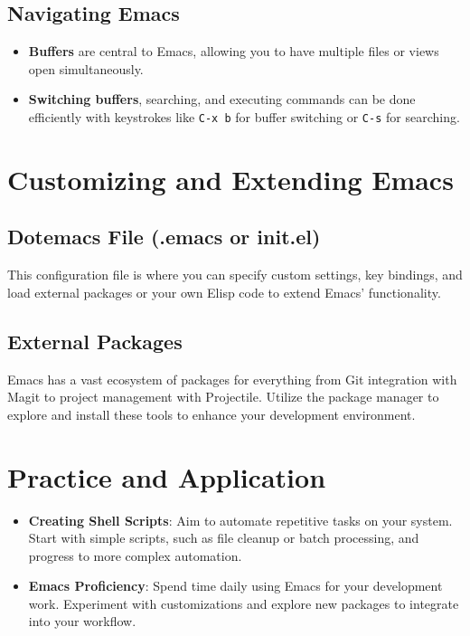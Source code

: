 \documentclass{article}
\begin{document}
\subsection{Navigating Emacs}

\begin{itemize}
    \item \textbf{Buffers} are central to Emacs, allowing you to have multiple files or views open simultaneously.
    \item \textbf{Switching buffers}, searching, and executing commands can be done efficiently with keystrokes like \texttt{C-x b} for buffer switching or \texttt{C-s} for searching.
\end{itemize}

\section{Customizing and Extending Emacs}

\subsection{Dotemacs File (.emacs or init.el)}

This configuration file is where you can specify custom settings, key bindings, and load external packages or your own Elisp code to extend Emacs' functionality.

\subsection{External Packages}

Emacs has a vast ecosystem of packages for everything from Git integration with Magit to project management with Projectile. Utilize the package manager to explore and install these tools to enhance your development environment.

\section{Practice and Application}

\begin{itemize}
    \item \textbf{Creating Shell Scripts}: Aim to automate repetitive tasks on your system. Start with simple scripts, such as file cleanup or batch processing, and progress to more complex automation.
    \item \textbf{Emacs Proficiency}: Spend time daily using Emacs for your development work. Experiment with customizations and explore new packages to integrate into your workflow.
\end{itemize}
\end{document}
